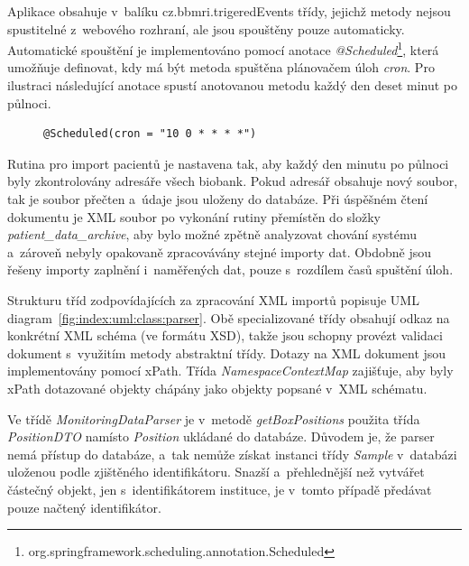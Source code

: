 \documentclass[11pt, final, oneside]{fithesis2}
\begin{document}
Aplikace obsahuje v~balíku cz.bbmri.trigeredEvents třídy, jejichž metody nejsou spustitelné z~webového rozhraní, ale jsou spouštěny pouze automaticky. Automatické spouštění je implementováno pomocí anotace \textit{@Scheduled}\footnote{org.springframework.scheduling.annotation.Scheduled}, která umožňuje definovat, kdy má být metoda spuštěna plánovačem úloh \textit{cron}. 
Pro ilustraci následující anotace spustí anotovanou metodu každý den deset minut po půlnoci. 
\begin{figure}[h!]
\centering
\begin{BVerbatim}
@Scheduled(cron = "10 0 * * * *")
\end{BVerbatim}
\end{figure}

Rutina pro import pacientů je nastavena tak, aby každý den minutu po půlnoci byly zkontrolovány adresáře všech biobank. Pokud adresář obsahuje nový soubor, tak je soubor přečten a~údaje jsou uloženy do databáze. Při úspěšném čtení dokumentu je XML soubor po vykonání rutiny přemístěn do složky \textit{patient\_data\_archive}, aby bylo možné zpětně analyzovat chování systému a~zároveň nebyly opakovaně zpracovávány stejné importy dat.
Obdobně jsou řešeny importy zaplnění i~naměřených dat, pouze s~rozdílem časů spuštění úloh.

Strukturu tříd zodpovídajících za zpracování XML importů popisuje UML diagram~\ref{fig:index:uml:class:parser}. Obě specializované třídy obsahují odkaz na konkrétní XML schéma (ve formátu XSD), takže jsou schopny provézt validaci dokument s~využitím metody abstraktní třídy. Dotazy na XML dokument jsou implementovány pomocí xPath.
Třída \textit{NamespaceContextMap} zajišťuje, aby byly xPath dotazované objekty chápány jako objekty popsané v~XML schématu.

Ve třídě \textit{MonitoringDataParser} je v~metodě \textit{getBoxPositions} použita třída \textit{PositionDTO} namísto \textit{Position} ukládané do databáze. Důvodem je, že parser nemá přístup do databáze, a~tak nemůže získat instanci třídy \textit{Sample} v~databázi uloženou podle zjištěného identifikátoru. Snazší a~přehlednější než vytvářet částečný objekt, jen s~identifikátorem instituce, je v~tomto případě předávat pouze načtený identifikátor. 
\end{document}
